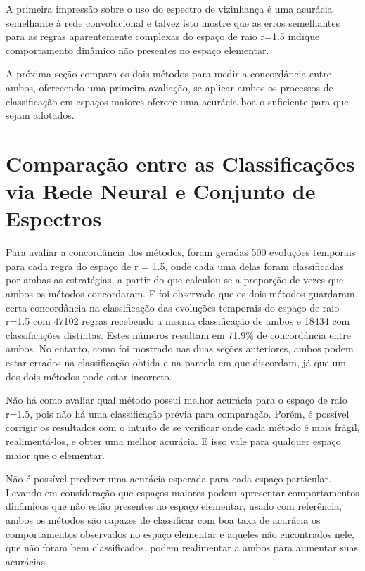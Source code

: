 \documentclass[12pt,a4paper]{report}
\begin{document}
	A primeira impressão sobre o uso do espectro de vizinhança é uma acurácia semelhante à rede convolucional e talvez isto mostre que as erros semelhantes para as regras aparentemente complexas do espaço de raio r=1.5 indique comportamento dinâmico não presentes no espaço elementar.
	
	A próxima seção compara os dois métodos para medir a concordância entre ambos, oferecendo uma primeira avaliação, se aplicar ambos os processos de classificação em espaços maiores oferece uma acurácia boa o suficiente para que sejam adotados.
	
	\section{Comparação entre as Classificações via Rede Neural e Conjunto de Espectros}
	\label{ComparacaoClassificacoesRedeNeuralConjuntoEspectros}
	
	Para avaliar a concordância dos métodos, foram geradas 500 evoluções temporais para cada regra do espaço de r = 1.5, onde cada uma delas foram classificadas por ambas as estratégias, a partir do que calculou-se a proporção de vezes que ambos os métodos concordaram. E foi observado que os dois métodos guardaram certa concordância na classificação das evoluções temporais do espaço de raio r=1.5 com 47102 regras recebendo a mesma classificação de ambos e 18434 com classificações distintas. Estes números resultam em 71.9\% de concordância entre ambos. No entanto, como foi mostrado nas duas seções anteriores, ambos podem estar errados na classificação obtida e na parcela em que discordam, já que um dos dois métodos pode estar incorreto.
	
	Não há como avaliar qual método possui melhor acurácia para o espaço de raio r=1.5, pois não há uma classificação prévia para comparação. Porém, é possível corrigir os resultados com o intuito de se verificar onde cada método é mais frágil, realimentá-los, e obter uma melhor acurácia. E isso vale para qualquer espaço maior que o elementar.

	Não é possível predizer uma acurácia esperada para cada espaço particular. Levando em consideração que espaços maiores podem apresentar comportamentos dinâmicos que não estão presentes no espaço elementar, usado com referência, ambos os métodos são capazes de classificar com boa taxa de acurácia os comportamentos observados no espaço elementar e aqueles não encontrados nele, que não foram bem classificados, podem realimentar a ambos para aumentar suas acurácias.
	
\end{document}

